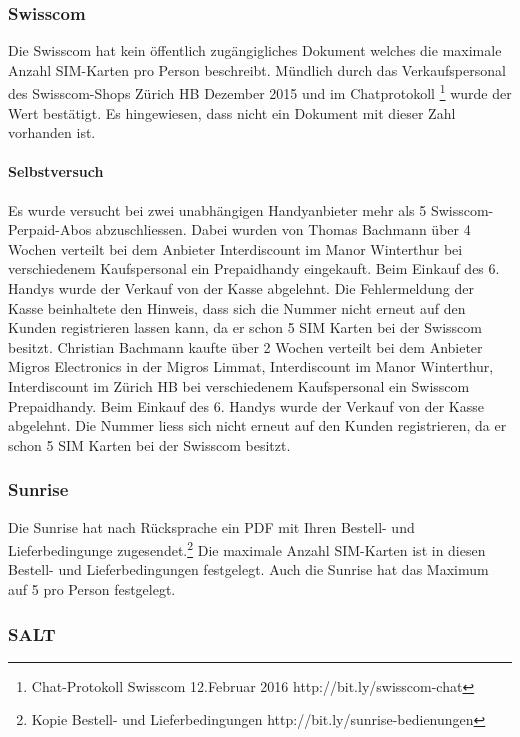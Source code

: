 \subsubsection{Swisscom}\label{swisscom}

Die Swisscom hat kein öffentlich zugängigliches Dokument welches die
maximale Anzahl SIM-Karten pro Person beschreibt. Mündlich durch das
Verkaufspersonal des Swisscom-Shops Zürich HB Dezember 2015 und im
Chatprotokoll \footnote{Chat-Protokoll Swisscom 12.Februar 2016
  http://bit.ly/swisscom-chat} wurde der Wert bestätigt. Es hingewiesen,
dass nicht ein Dokument mit dieser Zahl vorhanden ist.

\paragraph{Selbstversuch}\label{selbstversuch}

Es wurde versucht bei zwei unabhängigen Handyanbieter mehr als 5
Swisscom-Perpaid-Abos abzuschliessen. Dabei wurden von Thomas Bachmann
über 4 Wochen verteilt bei dem Anbieter Interdiscount im Manor
Winterthur bei verschiedenem Kaufspersonal ein Prepaidhandy eingekauft.
Beim Einkauf des 6. Handys wurde der Verkauf von der Kasse abgelehnt.
Die Fehlermeldung der Kasse beinhaltete den Hinweis, dass sich die
Nummer nicht erneut auf den Kunden registrieren lassen kann, da er schon
5 SIM Karten bei der Swisscom besitzt. Christian Bachmann kaufte über 2
Wochen verteilt bei dem Anbieter Migros Electronics in der Migros
Limmat, Interdiscount im Manor Winterthur, Interdiscount im Zürich HB
bei verschiedenem Kaufspersonal ein Swisscom Prepaidhandy. Beim Einkauf
des 6. Handys wurde der Verkauf von der Kasse abgelehnt. Die Nummer
liess sich nicht erneut auf den Kunden registrieren, da er schon 5 SIM
Karten bei der Swisscom besitzt.

\subsubsection{Sunrise}\label{sunrise}

Die Sunrise hat nach Rücksprache ein PDF mit Ihren Bestell- und
Lieferbedingunge zugesendet.\footnote{Kopie Bestell- und
  Lieferbedingungen http://bit.ly/sunrise-bedienungen} Die maximale
Anzahl SIM-Karten ist in diesen Bestell- und Lieferbedingungen
festgelegt. Auch die Sunrise hat das Maximum auf 5 pro Person
festgelegt.

\subsubsection{SALT}\label{salt}

